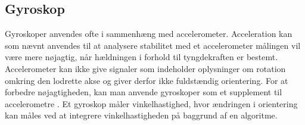\subsection{Gyroskop}

Gyroskoper anvendes ofte i sammenhæng med accelerometer. Acceleration kan som nævnt anvendes til at analysere stabilitet med et accelerometer målingen vil være mere nøjagtig, når hældningen i forhold til tyngdekraften er bestemt.
Accelerometer kan ikke give signaler som indeholder oplysninger om rotation omkring den lodrette akse og giver derfor ikke fuldstændig  orientering.
For at forbedre nøjagtigheden, kan man anvende gyroskoper som et supplement til accelerometre .
Et gyroskop måler vinkelhastighed, hvor ændringen i orientering kan måles ved at integrere vinkelhastigheden på baggrund af en algoritme. \citep{LuingeVeltink2005}